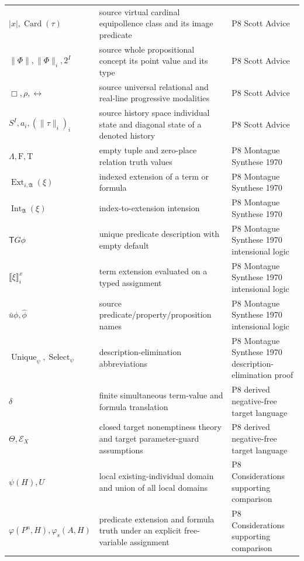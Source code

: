 \begin{longtable}{@{}p{}p{}p{}@{}}
\(|x|,\allowbreak \operatorname{Card}(\tau)\) & source virtual cardinal equipollence class and its image predicate & P8 Scott Advice \\
\(\|\Phi\|,\allowbreak \|\Phi\|_i,\allowbreak 2^I\) & source whole propositional concept its point value and its type & P8 Scott Advice \\
\(\Box,\allowbreak \boxed\rho,\allowbreak \boxed{\leftrightarrow}\) & source universal relational and real-line progressive modalities & P8 Scott Advice \\
\(S^I,\allowbreak a_i,\allowbreak (\|\tau\|_i)_i\) & source history space individual state and diagonal state of a denoted history & P8 Scott Advice \\
\(\Lambda,\allowbreak \mathrm F,\allowbreak \mathrm T\) & empty tuple and zero-place relation truth values & P8 Montague Synthese 1970 \\
\(\operatorname{Ext}_{i,\mathfrak A}(\xi)\) & indexed extension of a term or formula & P8 Montague Synthese 1970 \\
\(\operatorname{Int}_{\mathfrak A}(\xi)\) & index-to-extension intension & P8 Montague Synthese 1970 \\
\(\mathsf T G\phi\) & unique predicate description with empty default & P8 Montague Synthese 1970 intensional logic \\
\(\llbracket\xi\rrbracket_i^x\) & term extension evaluated on a typed assignment & P8 Montague Synthese 1970 intensional logic \\
\(\widehat{\bar u}\phi,\allowbreak \widehat\phi\) & source predicate/property/proposition names & P8 Montague Synthese 1970 intensional logic \\
\(\operatorname{Unique}_\psi,\allowbreak \operatorname{Select}_\psi\) & description-elimination abbreviations & P8 Montague Synthese 1970 description-\allowbreak{}elimination proof \\
\(\delta\) & finite simultaneous term-value and formula translation & P8 derived negative-\allowbreak{}free target language \\
\(\Theta,\allowbreak \mathcal E_X\) & closed target nonemptiness theory and target parameter-guard assumptions & P8 derived negative-\allowbreak{}free target language \\
\(\psi(H),\allowbreak U\) & local existing-individual domain and union of all local domains & P8 Considerations supporting comparison \\
\(\varphi(P^n,\allowbreak H),\allowbreak \varphi_s(A,\allowbreak H)\) & predicate extension and formula truth under an explicit free-variable assignment & P8 Considerations supporting comparison \\

\end{longtable}
